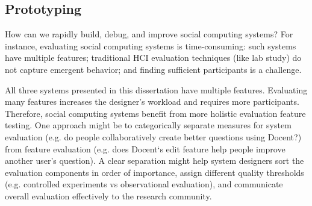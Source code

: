 
\subsection{Prototyping}
How can we rapidly build, debug, and improve social computing systems? For instance, evaluating social computing systems is time-consuming: such systems have multiple features; traditional HCI evaluation techniques (like lab study) do not capture emergent behavior; and finding sufficient participants is a challenge.

All three systems presented in this dissertation have multiple features. Evaluating many features increases the designer's workload and requires more participants. Therefore, social computing systems benefit from more holistic evaluation feature testing. One approach might be to categorically separate measures for system evaluation (e.g. do people collaboratively create better questions using Docent?) from feature evaluation (e.g. does Docent‘s edit feature help people improve another user’s question). A clear separation might help system designers sort the evaluation components in order of importance, assign different quality thresholds (e.g. controlled experiments vs observational evaluation), and communicate overall evaluation effectively to the research community.



